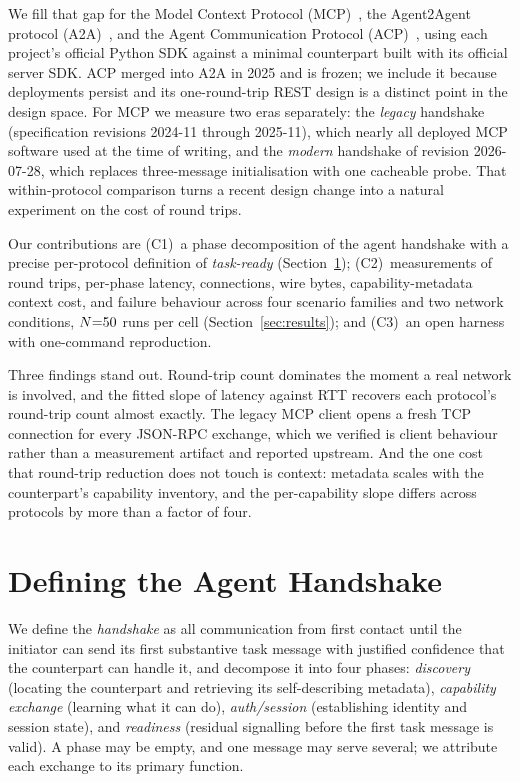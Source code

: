 \documentclass{article}
\begin{document}
We fill that gap for the Model Context Protocol
(MCP)~\citep{anthropic2024mcp,mcpspec2026}, the Agent2Agent protocol
(A2A)~\citep{a2aspec2026}, and the Agent Communication Protocol
(ACP)~\citep{acpspec2025}, using each project's official Python SDK against
a minimal counterpart built with its official server SDK. ACP merged into
A2A in 2025 and is frozen; we include it because deployments persist and
its one-round-trip REST design is a distinct point in the design space. For
MCP we measure two eras separately: the \emph{legacy} handshake
(specification revisions 2024-11 through 2025-11), which nearly all
deployed MCP software used at the time of writing, and the \emph{modern}
handshake of revision 2026-07-28, which replaces three-message
initialisation with one cacheable probe. That within-protocol comparison
turns a recent design change into a natural experiment on the cost of
round trips.

Our contributions are (C1)~a phase decomposition of the agent handshake
with a precise per-protocol definition of \emph{task-ready}
(Section~\ref{sec:defs}); (C2)~measurements of round trips, per-phase
latency, connections, wire bytes, capability-metadata context cost, and
failure behaviour across four scenario families and two network conditions,
$N{=}50{}$ runs per cell (Section~\ref{sec:results}); and (C3)~an open
harness with one-command reproduction.

Three findings stand out. Round-trip count dominates the moment a real
network is involved, and the fitted slope of latency against RTT recovers
each protocol's round-trip count almost exactly. The legacy MCP client
opens a fresh TCP connection for every JSON-RPC exchange, which we verified
is client behaviour rather than a measurement artifact and reported
upstream. And the one cost that round-trip reduction does not touch is
context: metadata scales with the counterpart's capability inventory, and
the per-capability slope differs across protocols by more than a factor of
four.

\section{Defining the Agent Handshake}
\label{sec:defs}

We define the \emph{handshake} as all communication from first contact
until the initiator can send its first substantive task message with
justified confidence that the counterpart can handle it, and decompose it
into four phases: \emph{discovery} (locating the counterpart and retrieving
its self-describing metadata), \emph{capability exchange} (learning what it
can do), \emph{auth/session} (establishing identity and session state), and
\emph{readiness} (residual signalling before the first task message is
valid). A phase may be empty, and one message may serve several; we
attribute each exchange to its primary function.
\end{document}

